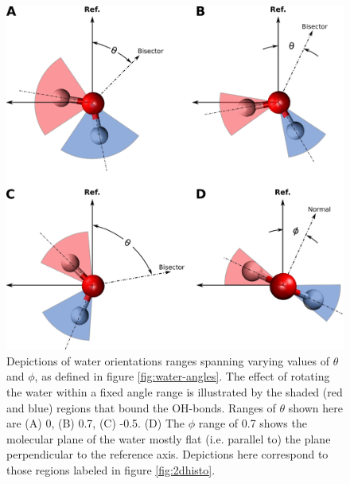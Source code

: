 \newcommand{\degree}{\ensuremath{^\circ}}

\begin{figure}[h!]
\begin{center}
	\includegraphics[scale=1.0]{images/h2o-angle-ranges.png}
	\caption{Depictions of water orientations ranges spanning varying values of $\theta$ and $\phi$, as defined in figure \ref{fig:water-angles}. The effect of rotating the water within a fixed angle range is illustrated by the shaded (red and blue) regions that bound the OH-bonds. Ranges of $\theta$ shown here are (A) 0, (B) 0.7, (C) -0.5. (D) The $\phi$ range of 0.7 shows the molecular plane of the water mostly flat (i.e. parallel to) the plane perpendicular to the reference axis. Depictions here correspond to those regions labeled in figure \ref{fig:2dhisto}.}
	\label{fig:angle-ranges}
\end{center}
\end{figure}

